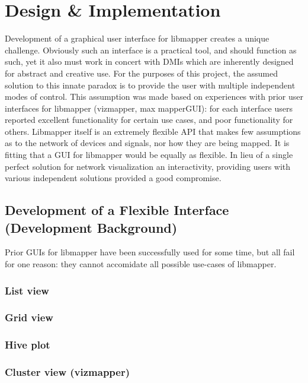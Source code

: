 \chapter{Design \& Implementation}

	Development of a graphical user interface for libmapper creates a unique challenge. Obviously such an interface is a practical tool, and should function as such, yet it also must work in concert with DMIs which are inherently designed for abstract and creative use. For the purposes of this project, the assumed solution to this innate paradox is to provide the user with multiple independent modes of control.  This assumption was made based on experiences with prior user interfaces for libmapper (vizmapper, max mapperGUI): for each interface users reported excellent functionality for certain use cases, and poor functionality for others. Libmapper itself is an extremely flexible API that makes few assumptions as to the network of devices and signals, nor how they are being mapped. It is fitting that a GUI for libmapper would be equally as flexible. In lieu of a single perfect solution for network visualization an interactivity, providing users with various independent solutions provided a good compromise.
	

\section{Development of a Flexible Interface (Development Background)}
	
Prior GUIs for libmapper have been successfully used for some time, but all fail for one reason: they cannot accomidate all possible use-cases of libmapper. 

\subsection{List view}
\label{sec:list_view}
\subsection{Grid view}
\subsection{Hive plot}
\subsection{Cluster view (vizmapper)}

